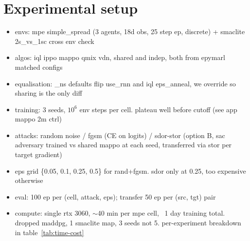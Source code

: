 \documentclass{article}
\begin{document}


\section{Experimental setup}

\begin{itemize}
  \item envs: mpe simple\_spread (3 agents, 18d obs, 25 step ep, discrete) + smaclite 2s\_vs\_1sc cross env check
  \item algos: iql ippo mappo qmix vdn, shared and indep, both from epymarl matched configs
  \item equalisation: \_ns defaults flip use\_rnn and iql eps\_anneal, we override so sharing is the only diff
  \item training: 3 seeds, $10^6$ env steps per cell. plateau well before cutoff (see app mappo 2m ctrl)
  \item attacks: random noise / fgsm (CE on logits) / sdor-stor (option B, sac adversary trained vs shared mappo at each seed, transferred via stor per target gradient)
  \item eps grid \{0.05, 0.1, 0.25, 0.5\} for rand+fgsm. sdor only at 0.25, too expensive otherwise
  \item eval: 100 ep per (cell, attack, eps); transfer 50 ep per (src, tgt) pair
  \item compute: single rtx 3060, $\sim$40 min per mpe cell, ~1 day training total. dropped maddpg, 1 smaclite map, 3 seeds not 5. per-experiment breakdown in table~\ref{tab:time-cost}
\end{itemize}
\end{document}
